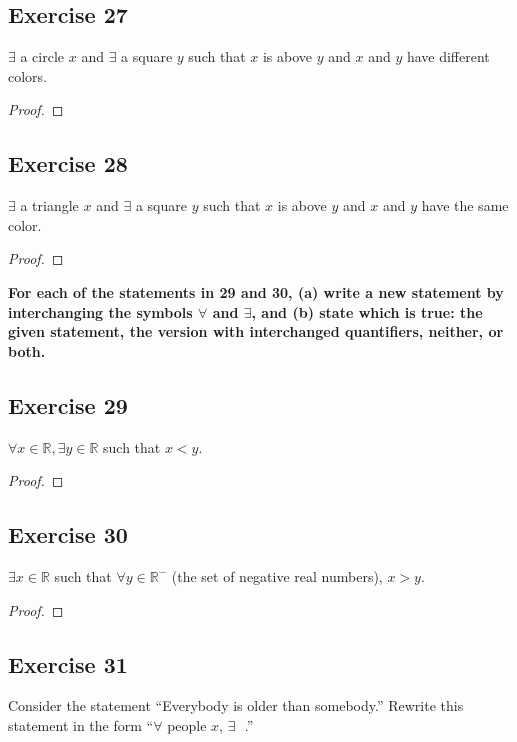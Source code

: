 \documentclass[14pt]{extarticle}
\newcommand{\fbl}{\underline{\hspace{1cm}}\,\,}
\newcommand{\R}{\mathbb{R}}
\newcommand{\fa}{\forall}
\newcommand{\te}{\exists}
\begin{document}
\subsection{Exercise 27}
$\te$ a circle $x$ and $\te$ a square $y$ such that $x$ is above $y$ and $x$ and $y$ have different colors.

\begin{proof}

\end{proof}

\subsection{Exercise 28}
$\te$ a triangle $x$ and $\te$ a square $y$ such that $x$ is above $y$ and $x$ and $y$ have the same color.

\begin{proof}

\end{proof}

{\bf \color{cyan} For each of the statements in 29 and 30, (a) write a new statement by interchanging the symbols $\fa$ and $\te$, and (b) state which is true: the given statement, the version with interchanged quantifiers, neither, or both.}

\subsection{Exercise 29}
$\fa x \in \R, \te y \in \R$ such that $x < y$.

\begin{proof}

\end{proof}

\subsection{Exercise 30}
$\te x \in \R$ such that $\fa y \in \R^-$ (the set of negative real numbers), $x > y$.

\begin{proof}

\end{proof}

\subsection{Exercise 31}
Consider the statement “Everybody is older than somebody.” Rewrite this statement in the form “$\fa$ people $x$, $\te$ \fbl.”
\end{document}
